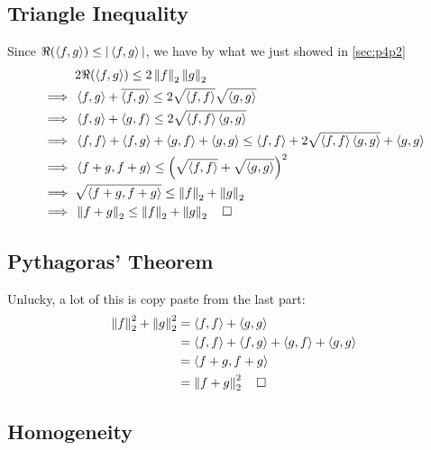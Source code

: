 \documentclass[12pt]{article}
\newcommand{\norm}[1]{\left\lVert#1\right\rVert}
\begin{document}
\pagebreak

\subsection{Triangle Inequality}

Since $\Re(\braket{f, g}) \le |\braket{f, g}|$, we have by what we just showed in \ref{sec:p4p2}
\begin{align*}
             & 2\Re(\braket{f, g}) \le 2\norm{f}_2\norm{g}_2                                          \\
  \implies{} & \braket{f, g} + \overline{\braket{f, g}} \le 2\sqrt{\braket{f, f}}\sqrt{\braket{g, g}} \\
  \implies{} & \braket{f, g} + \braket{g, f} \le 2\sqrt{\braket{f, f}\braket{g, g}}                   \\
  \implies{} & \braket{f, f} + \braket{f, g} + \braket{g, f} + \braket{g, g}
  \le \braket{f, f} + 2\sqrt{\braket{f, f}\braket{g, g}} + \braket{g, g}                              \\
  \implies{} & \braket{f + g, f + g} \le \left(\sqrt{\braket{f, f}} + \sqrt{\braket{g, g}}\right)^2     \\
  \implies{} & \sqrt{\braket{f + g, f + g}} \le \norm{f}_2 + \norm{g}_2                               \\
  \implies{} & \norm{f+g}_2 \le \norm{f}_2+\norm{g}_2\quad\square
\end{align*}

\subsection{Pythagoras' Theorem}

Unlucky, a lot of this is copy paste from the last part:
\begin{align*}
  \norm{f}_2^2 + \norm{g}_2^2
   & = \braket{f, f} + \braket{g, g}                                 \\
   & = \braket{f, f} + \braket{f, g} + \braket{g, f} + \braket{g, g} \\
   & = \braket{f + g, f + g}                                         \\
   & = \norm{f+g}_2^2\quad\square
\end{align*}

\subsection{Homogeneity}
\end{document}
